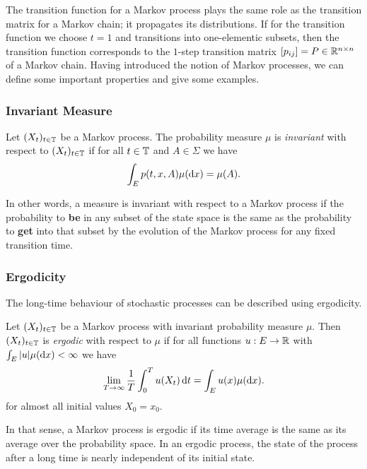 The transition function for a Markov process plays the same role as the transition matrix for a Markov chain; it propagates its distributions. 
If for the transition function we choose $t=1$ and transitions into one-elementic subsets, then the transition function corresponds to the $1$-step transition matrix $[p_{ij}]= P \in \mathbb{R}^{n \times n}$ of a Markov chain.
Having introduced the notion of Markov processes, we can define some important properties and give some examples.

\subsubsection*{Invariant Measure}

\begin{defi}
Let $(X_t)_{t\in\mathbb{T}}$ be a Markov process. The probability measure $\mu$ is \textit{invariant} with respect to $(X_t)_{t\in\mathbb{T}}$ if for all $t\in\mathbb{T}$ and $A \in \Sigma$ we have
\begin{equation*}
\int_E p(t,x,A) \mu(\mathop{}\!\mathrm{d} x) = \mu(A).
\end{equation*}
\end{defi}
In other words, a measure is invariant with respect to a Markov process if the probability to \textbf{be} in any subset of the state space is the same as the probability to \textbf{get} into that subset by the evolution of the Markov process for any fixed transition time.

\subsubsection*{Ergodicity}
The long-time behaviour of stochastic processes can be described using ergodicity.
\begin{defi}
Let $(X_t)_{t\in\mathbb{T}}$ be a Markov process with invariant probability measure $\mu$. Then $(X_t)_{t\in\mathbb{T}}$ is \textit{ergodic} with respect to $\mu$ if for all functions $u: E \rightarrow \mathbb{R}$ with $\int_E |u| \mu(\mathop{}\!\mathrm{d} x) < \infty$
we have
\begin{equation*}
\lim_{T \rightarrow \infty} \frac{1}{T} \int_0^T u(X_t) \mathop{}\!\mathrm{d} t = \int_E u(x) \mu(\mathop{}\!\mathrm{d} x).
\end{equation*}
for almost all initial values $X_0=x_0$.
\end{defi}
In that sense, a Markov process is ergodic if its time average is the same as its average over the probability space.
In an ergodic process, the state of the process after a long time is nearly independent of its initial state.

